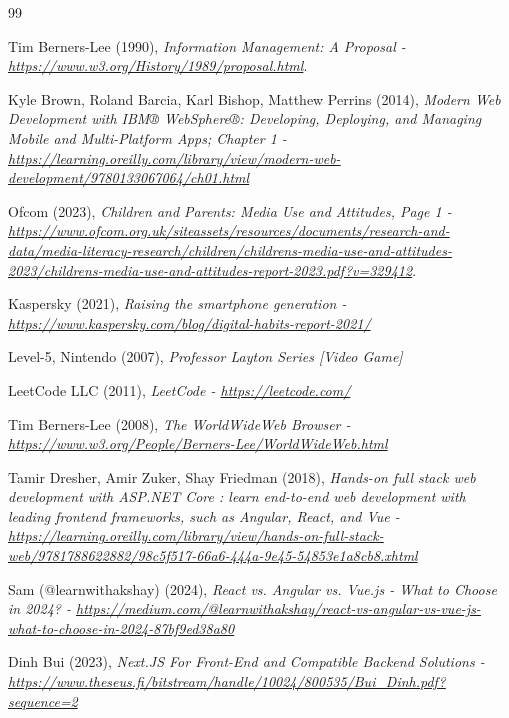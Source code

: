 \documentclass[]{final_report}
\begin{document}
\begin{thebibliography}{99}
 Tim Berners-Lee (1990),
\emph{Information Management: A Proposal - \url{https://www.w3.org/History/1989/proposal.html}}.

 Kyle Brown, Roland Barcia, Karl Bishop, Matthew Perrins (2014),
\emph{Modern Web Development with IBM® WebSphere®: Developing, Deploying, and Managing Mobile and Multi-Platform Apps; Chapter 1 - \url{https://learning.oreilly.com/library/view/modern-web-development/9780133067064/ch01.html}}

 Ofcom (2023),
\emph{Children and Parents: Media Use and Attitudes, Page 1 - \url{https://www.ofcom.org.uk/siteassets/resources/documents/research-and-data/media-literacy-research/children/childrens-media-use-and-attitudes-2023/childrens-media-use-and-attitudes-report-2023.pdf?v=329412}}.

 Kaspersky (2021),
\emph{Raising the smartphone generation - \url{https://www.kaspersky.com/blog/digital-habits-report-2021/}}

 Level-5, Nintendo (2007),
\emph{ Professor Layton Series [Video Game]}

 LeetCode LLC (2011),
\emph{LeetCode - \url{https://leetcode.com/}}


 Tim Berners-Lee (2008),
\emph{The WorldWideWeb Browser - \url{https://www.w3.org/People/Berners-Lee/WorldWideWeb.html}}

 Tamir Dresher, Amir Zuker, Shay Friedman (2018),
\emph{Hands-on full stack web development with ASP.NET Core : learn end-to-end web development with leading frontend frameworks, such as Angular, React, and Vue - \url{https://learning.oreilly.com/library/view/hands-on-full-stack-web/9781788622882/98c5f517-66a6-444a-9e45-54853e1a8cb8.xhtml}}

 Sam (@learnwithakshay) (2024),
\emph{React vs. Angular vs. Vue.js - What to Choose in 2024? - \url{https://medium.com/@learnwithakshay/react-vs-angular-vs-vue-js-what-to-choose-in-2024-87bf9ed38a80}}

 Dinh Bui (2023),
\emph{Next.JS For Front-End and Compatible Backend Solutions - \url{https://www.theseus.fi/bitstream/handle/10024/800535/Bui_Dinh.pdf?sequence=2}}


\end{thebibliography}
\end{document}
